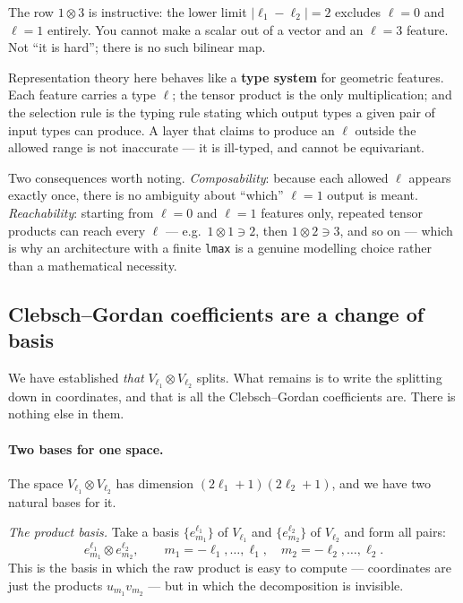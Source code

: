 \documentclass[11pt,a4paper]{report}
\theoremstyle{definition}
\theoremstyle{remark}
\begin{document}
The row $1\otimes3$ is instructive: the lower limit $|\ell_1-\ell_2|=2$
excludes $\ell=0$ and $\ell=1$ entirely. You cannot make a scalar out of a
vector and an $\ell=3$ feature. Not ``it is hard''; there is no such
bilinear map.

\begin{tcolorbox}[colback=green!3,colframe=green!35!black,title=A useful way to think about it]
Representation theory here behaves like a \textbf{type system} for
geometric features. Each feature carries a type $\ell$; the tensor product
is the only multiplication; and the selection rule is the typing rule
stating which output types a given pair of input types can produce. A layer
that claims to produce an $\ell$ outside the allowed range is not
inaccurate --- it is ill-typed, and cannot be equivariant.

Two consequences worth noting. \emph{Composability}: because each allowed
$\ell$ appears exactly once, there is no ambiguity about ``which'' $\ell=1$
output is meant. \emph{Reachability}: starting from $\ell=0$ and $\ell=1$
features only, repeated tensor products can reach every $\ell$ --- e.g.\
$1\otimes1\ni2$, then $1\otimes2\ni3$, and so on --- which is why an
architecture with a finite \texttt{lmax} is a genuine modelling choice
rather than a mathematical necessity.
\end{tcolorbox}

\subsection{Clebsch--Gordan coefficients are a change of basis}
\label{sec:cg-change-of-basis}

We have established \emph{that} $V_{\ell_1}\otimes V_{\ell_2}$ splits. What
remains is to write the splitting down in coordinates, and that is all the
Clebsch--Gordan coefficients are. There is nothing else in them.

\paragraph{Two bases for one space.} The space
$V_{\ell_1}\otimes V_{\ell_2}$ has dimension $(2\ell_1+1)(2\ell_2+1)$, and we
have two natural bases for it.

\emph{The product basis.} Take a basis $\{e^{\ell_1}_{m_1}\}$ of
$V_{\ell_1}$ and $\{e^{\ell_2}_{m_2}\}$ of $V_{\ell_2}$ and form all pairs:
\[
e^{\ell_1}_{m_1}\otimes e^{\ell_2}_{m_2},
\qquad m_1=-\ell_1,\dots,\ell_1,\quad m_2=-\ell_2,\dots,\ell_2 .
\]
This is the basis in which the raw product is easy to compute --- coordinates
are just the products $u_{m_1}v_{m_2}$ --- but in which the decomposition is
invisible.
\end{document}
